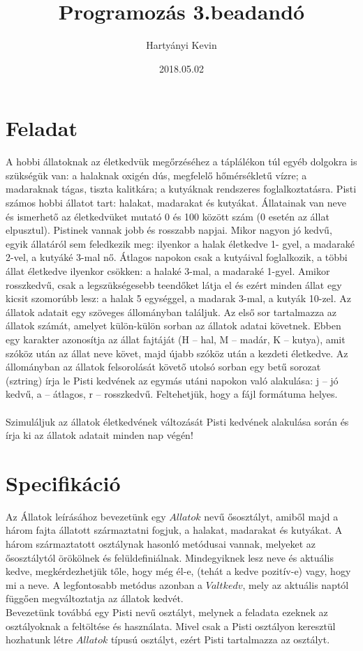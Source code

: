 \documentclass[a4paper]{article}
\title {Programozás 3.beadandó}
\date{2018.05.02}
\author {Hartyányi Kevin}
\begin{document}
	
	\maketitle
	\tableofcontents
	\newpage
	
	\section{Feladat}
	
	A hobbi állatoknak az életkedvük megőrzéséhez a táplálékon túl egyéb dolgokra is
	szükségük van: a halaknak oxigén dús, megfelelő hőmérsékletű vízre; a madaraknak tágas,
	tiszta kalitkára; a kutyáknak rendszeres foglalkoztatásra. Pisti számos hobbi állatot tart:
	halakat, madarakat és kutyákat. Állatainak van neve és ismerhető az életkedvüket mutató 0
	és 100 között szám (0 esetén az állat elpusztul). Pistinek vannak jobb és rosszabb napjai.
	Mikor nagyon jó kedvű, egyik állatáról sem feledkezik meg: ilyenkor a halak életkedve 1-
	gyel, a madaraké 2-vel, a kutyáké 3-mal nő. Átlagos napokon csak a kutyáival foglalkozik,
	a többi állat életkedve ilyenkor csökken: a halaké 3-mal, a madaraké 1-gyel. Amikor
	rosszkedvű, csak a legszükségesebb teendőket látja el és ezért minden állat egy kicsit
	szomorúbb lesz: a halak 5 egységgel, a madarak 3-mal, a kutyák 10-zel.
	Az állatok adatait egy szöveges állományban találjuk. Az első sor tartalmazza az állatok
	számát, amelyet külön-külön sorban az állatok adatai követnek. Ebben egy karakter
	azonosítja az állat fajtáját (H – hal, M – madár, K – kutya), amit szóköz után az állat neve
	követ, majd újabb szóköz után a kezdeti életkedve. Az állományban az állatok felsorolását 
	követő utolsó sorban egy betű sorozat (sztring) írja le Pisti kedvének az egymás utáni
	napokon való alakulása: j – jó kedvű, a – átlagos, r – rosszkedvű. Feltehetjük, hogy a fájl
	formátuma helyes.\\\\
	Szimuláljuk az állatok életkedvének változását Pisti kedvének alakulása során és írja ki
	az állatok adatait minden nap végén!

	\newpage

	\section{Specifikáció}	
		Az Állatok leírásához bevezetünk egy $Allatok$ nevű ősosztályt, amiből majd a három fajta állatott származtatni fogjuk, a halakat, madarakat és kutyákat. A három származtatott osztálynak hasonló metódusai vannak, melyeket az ősosztálytól örökölnek és felüldefiniálnak. Mindegyiknek lesz neve és aktuális kedve, megkérdezhetjük tőle, hogy még él-e, (tehát a kedve pozitív-e) vagy, hogy mi a neve. A legfontosabb metódus azonban a $Valtkedv$, mely az aktuális naptól függően megváltoztatja az állatok kedvét.\\
		Bevezetünk továbbá egy Pisti nevű osztályt, melynek a feladata ezeknek az osztályoknak a feltöltése és használata. Mivel csak a Pisti osztályon keresztül hozhatunk létre $Allatok$ típusú osztályt, ezért Pisti tartalmazza az osztályt.
		
\end{document}
